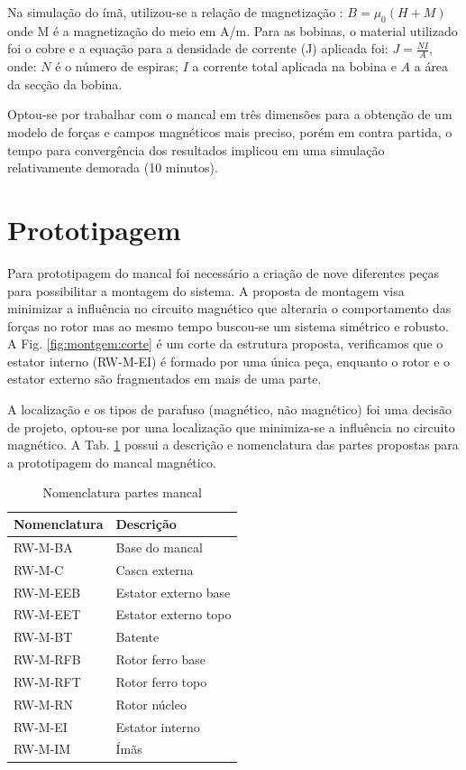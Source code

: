 Na simulação do ímã, utilizou-se a relação de magnetização : $B = \mu_0 (H + M)$ onde M é a magnetização do meio em A/m. Para as bobinas, o material utilizado foi o cobre e a equação para a densidade de corrente (J) aplicada foi: $ J = \frac{N I}{A}$, onde: $N$ é o número de espiras; $I$ a corrente total aplicada na bobina e $A$ a área da secção da bobina.

Optou-se por trabalhar com o mancal em três dimensões para a obtenção de um modelo de forças e campos magnéticos mais preciso, porém em contra partida, o tempo para convergência dos resultados implicou em uma simulação relativamente demorada (10 minutos).


\section{Prototipagem}

 
Para prototipagem do mancal foi necessário a criação de nove diferentes peças para possibilitar a montagem do sistema. A proposta de montagem visa minimizar a influência no circuito magnético que alteraria o comportamento das forças no rotor mas ao mesmo tempo buscou-se um sistema simétrico e robusto.  A Fig. \ref{fig:montgem:corte} é um corte da estrutura proposta, verificamos que o estator interno (RW-M-EI) é formado por uma única peça, enquanto o rotor e o estator externo são fragmentados em mais de uma parte.

A localização e os tipos de parafuso (magnético, não magnético) foi uma decisão de projeto, optou-se por uma localização que minimiza-se a influência no circuito magnético. A Tab. \ref{Tab:nomenclatura:mancal} possui a descrição e nomenclatura das partes propostas para a prototipagem do mancal magnético.

 \begin{table}[ht!]
 	\centering
 	\begin{tabular}{l l}
 		Nomenclatura & Descrição  \\ \hline
 		RW-M-BA 		&	Base do mancal \\
 		RW-M-C   		 &	Casca externa\\
 		RW-M-EEB	  & Estator externo base\\
 		RW-M-EET & 	Estator externo topo\\
 		RW-M-BT & 	Batente\\
 		RW-M-RFB & 	Rotor ferro base\\
 		RW-M-RFT	&  Rotor ferro topo\\
 		RW-M-RN & 	Rotor núcleo\\
 		RW-M-EI	&  Estator interno\\
		RW-M-IM	&  Ímãs 
 	\end{tabular} 
 	\caption{Nomenclatura partes mancal}
 	\label{Tab:nomenclatura:mancal} 
 \end{table} 

